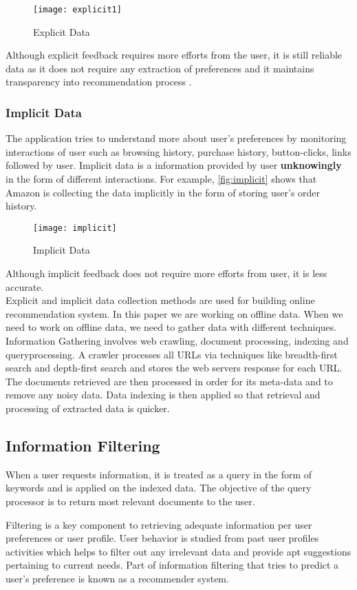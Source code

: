 \begin{figure}[H]
	\centering
	\texttt{[image: explicit1]}
	\caption{Explicit Data}
	\label{fig:explicit}
\end{figure}

Although explicit feedback requires more efforts from the user, it is still reliable data as it does not require any extraction of preferences and it maintains transparency into recommendation process \cite{35}. 
 
\subsubsection{Implicit Data}

The application tries to understand more about user's preferences by monitoring interactions of user such as browsing history, purchase history, button-clicks, links followed by user. Implicit data is a information provided by user \textbf{unknowingly} in the form of different interactions. For example, \autoref{fig:implicit} shows that Amazon is collecting the data implicitly in the form of storing user's order history. 
\begin{figure}[H]
	\centering
	\texttt{[image: implicit]}
	\caption{Implicit Data}
	\label{fig:implicit}
\end{figure}

Although implicit feedback does not require more efforts from user, it is less accurate.\\

Explicit and implicit data collection methods are used for building online recommendation system. In this paper we are working on offline data. When we need to work on offline data, we need to gather data with different techniques. \\
Information Gathering involves web crawling, document processing, indexing and queryprocessing. A crawler processes all URLs via techniques like breadth-first search and depth-first search and stores the web servers response for each URL. The documents retrieved are then processed in order for its meta-data and to remove any noisy data. Data indexing is then applied so that retrieval and processing of extracted data is quicker.


\subsection{Information Filtering}

When a user requests information, it is treated as a query in the form of keywords and is applied on the indexed data. The objective of the query processor is to return most relevant documents to the user.

Filtering is a key component to retrieving adequate information per user preferences or user profile. User behavior is studied from past user profiles activities which helps to filter out any irrelevant data and provide apt suggestions pertaining to current needs. Part of information filtering that tries to predict a user's preference is known as a recommender system.
